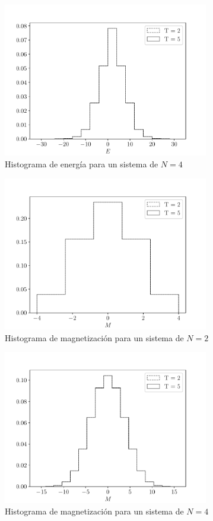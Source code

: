 \documentclass[11pt,a4paper]{article}
\begin{document}
\begin{figure}[H]
    \centering
    \includegraphics[width=0.8\textwidth]{p2/b/N4_energy_GrayFlip.pdf}
    \caption{Histograma de energía para un sistema de $N=4$}
    \label{fig:p2_4}
\end{figure}

\begin{figure}[H]
    \centering
    \includegraphics[width=0.8\textwidth]{p2/b/N2_magnetizacion_GrayFlip.pdf}
    \caption{Histograma de magnetización para un sistema de $N=2$}
    \label{fig:p2_5}
\end{figure}

\begin{figure}[H]
    \centering
    \includegraphics[width=0.8\textwidth]{p2/b/N4_magnetizacion_GrayFlip.pdf}
    \caption{Histograma de magnetización para un sistema de $N=4$}
    \label{fig:p2_6}
\end{figure}
\end{document}
